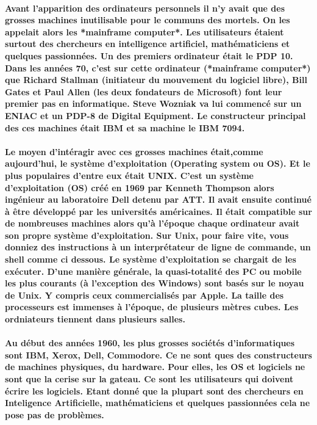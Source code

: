 \paragraph{
  Avant l'apparition des ordinateurs personnels il n'y avait que des grosses machines inutilisable pour le communs des mortels. On les appelait alors les *mainframe computer*. Les utilisateurs étaient surtout des chercheurs en intelligence artificiel, mathématiciens et quelques passionnées. Un des premiers ordinateur était le PDP 10. Dans les années 70, c'est sur cette ordinateur (*mainframe computer*) que  Richard Stallman (initiateur du mouvement du logiciel libre), Bill Gates et Paul Allen (les deux fondateurs de Microsoft) font leur premier pas en informatique. Steve Wozniak va lui commencé sur un ENIAC et un PDP-8 de Digital Equipment. Le constructeur principal des ces machines était IBM et sa machine le IBM 7094.
}

\paragraph{
  Le moyen d'intéragir avec ces grosses machines était,comme aujourd'hui, le système d'exploitation (Operating system ou OS). Et le plus populaires d'entre eux était UNIX. C'est un système d'exploitation (OS) créé en 1969 par Kenneth Thompson alors ingénieur au laboratoire Dell detenu par ATT. Il avait ensuite continué à être développé par les universités américaines. Il était compatible sur de nombreuses machines alors qu'à l'époque chaque ordinateur avait son propre système d'exploitation. Sur Unix, pour faire vite, vous donniez des instructions à un interprétateur de ligne de commande, un shell comme ci dessous. Le système d'exploitation se chargait de les exécuter. D'une manière générale, la quasi-totalité des PC ou mobile les plus courants (à l'exception des Windows) sont basés sur le noyau de Unix. Y compris ceux commercialisés par Apple. La taille des processeurs est immenses à l'époque, de plusieurs mètres cubes. Les ordniateurs tiennent dans plusieurs salles.
}

\paragraph{
  Au début des années 1960, les plus grosses sociétés d'informatiques sont IBM, Xerox, Dell, Commodore. Ce ne sont ques des constructeurs de machines physiques, du hardware. Pour elles, les OS et logiciels ne sont que la cerise sur la gateau. Ce sont les utilisateurs qui doivent écrire les logiciels. Etant donné que la plupart sont des chercheurs en Inteligence Artificielle, mathématiciens et quelques passionnées cela ne pose pas de problèmes.
}

